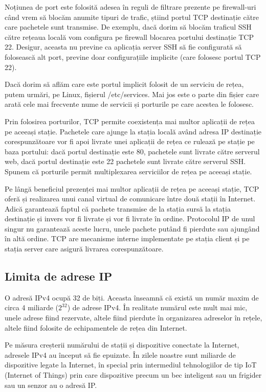 Noțiunea de port este folosită adesea în reguli de filtrare prezente pe firewall-uri când vrem să blocăm anumite tipuri de trafic, știind portul TCP destinație către care pachetele sunt transmise. De exemplu, dacă dorim să blocăm traficul SSH către rețeaua locală vom configura pe firewall blocarea portului destinație TCP 22. Desigur, aceasta nu previne ca aplicația server SSH să fie configurată să folosească alt port, previne doar configurațiile implicite (care folosesc portul TCP 22).

Dacă dorim să aflăm care este portul implicit folosit de un serviciu de rețea, putem urmări, pe Linux, fișierul /etc/services. Mai jos este o parte din fișier care arată cele mai frecvente nume de servicii și porturile pe care acestea le folosesc.

Prin folosirea porturilor, TCP permite coexistența mai multor aplicații de rețea pe aceeași stație. Pachetele care ajunge la stația locală având adresa IP destinație corespunzătoare vor fi apoi livrate unei aplicații de rețea ce rulează pe stație pe baza portului: dacă portul destinație este 80, pachetele sunt livrate către serverul web, dacă portul destinație este 22 pachetele sunt livrate către serverul SSH. Spunem că porturile permit multiplexarea serviciilor de rețea pe aceeași stație.

Pe lângă beneficiul prezenței mai multor aplicații de rețea pe aceeași stație, TCP oferă și realizarea unui canal virtual de comunicare între două stații în Internet. Adică garantează faptul că pachete transmise de la stația sursă la stația destinație și invers vor fi livrate și vor fi livrate în ordine. Protocolul IP de unul singur nu garantează aceste lucru, unele pachete putând fi pierdute sau ajungând în altă ordine. TCP are mecanisme interne implementate pe stația client și pe stația server care asigură livrarea corespunzătoare.

\subsection{Limita de adrese IP}
\label{sec:net:ip-limit}

O adresă IPv4 ocupă 32 de biți. Aceasta înseamnă că există un număr maxim de circa 4 miliarde ($2^32$) de adrese IPv4. În realitate numărul este mult mai mic, unele adrese fiind rezervate, altele fiind pierdute în organizarea adreselor în rețele, altele fiind folosite de echipamentele de rețea din Internet.

Pe măsura creșterii numărului de stații și dispozitive conectate la Internet, adresele IPv4 au început să fie epuizate. În zilele noastre sunt miliarde de dispozitive legate la Internet, în special prin intermediul tehnologiilor de tip IoT (Internet of Things) prin care dispozitive precum un bec inteligent sau un frigider sau un senzor au o adresă IP.

